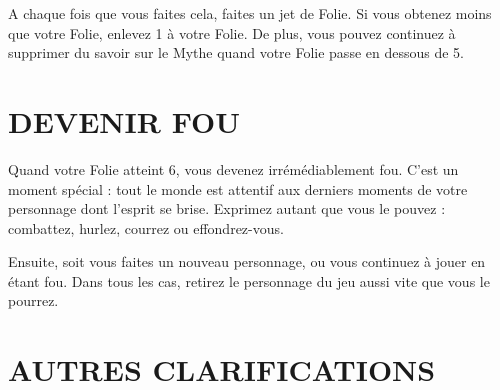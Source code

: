 \documentclass[11pt]{article}
\begin{document}
A chaque fois que vous faites cela, faites un jet de Folie. Si vous obtenez moins que votre Folie, enlevez 1 à votre Folie. De plus, vous pouvez continuez à supprimer du savoir sur le Mythe quand votre Folie passe en dessous de 5.

\section{DEVENIR FOU}

Quand votre Folie atteint 6, vous devenez irrémédiablement fou. C'est un moment spécial : tout le monde est attentif aux derniers moments de votre personnage dont l'esprit se brise. Exprimez autant que vous le pouvez : combattez, hurlez, courrez ou effondrez-vous.

Ensuite, soit vous faites un nouveau personnage, ou vous continuez à jouer en étant fou. Dans tous les cas, retirez le personnage du jeu aussi vite que vous le pourrez.

\section{AUTRES CLARIFICATIONS}
\end{document}
